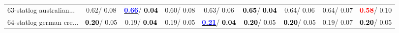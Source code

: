 \begin{table}[h]
\begin{center}
\begin{tabular}{lc|c|c|c|c|c|c|c}
63-statlog australian... &   0.62/  0.08 & \underline{\textcolor{blue}{\textbf{  0.66}}}/\textcolor{black}{\textbf{  0.04}} &   0.60/  0.08 &   0.63/  0.06 & \textcolor{black}{\textbf{  0.65}}/\textcolor{black}{\textbf{  0.04}} &   0.64/  0.06 &   0.64/  0.07 & \textcolor{red}{\textbf{  0.58}}/  0.10 \\
64-statlog german cre... & \textcolor{black}{\textbf{  0.20}}/  0.05 &   0.19/\textcolor{black}{\textbf{  0.04}} &   0.19/  0.05 & \underline{\textcolor{blue}{\textbf{  0.21}}}/\textcolor{black}{\textbf{  0.04}} & \textcolor{black}{\textbf{  0.20}}/  0.05 & \textcolor{black}{\textbf{  0.20}}/  0.05 &   0.19/  0.07 & \textcolor{black}{\textbf{  0.20}}/  0.05 \\\end{tabular}\label{stratsALCKappa1bC4.5}
\end{center}
\end{table}
